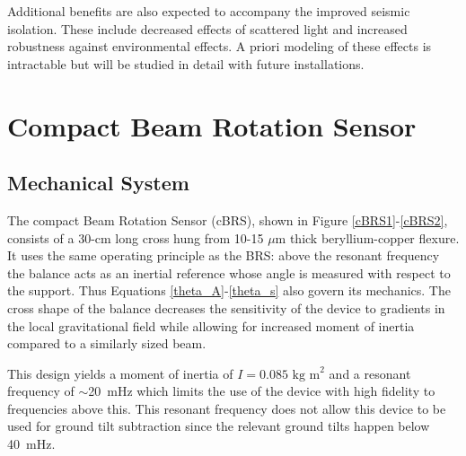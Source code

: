 \documentclass [12pt, proquest]{uwthesis}[2019]
\begin{document}
Additional benefits are also expected to accompany the improved seismic isolation. These include decreased effects of scattered light and increased robustness against environmental effects. A priori modeling of these effects is intractable but will be studied in detail with future installations.


\section{Compact Beam Rotation Sensor} \label{cBRSSec}
\subsection{Mechanical System}

The compact Beam Rotation Sensor (cBRS), shown in Figure \ref{cBRS1}-\ref{cBRS2}, consists of a 30-cm long cross hung from 10-15 $\mu$m thick beryllium-copper flexure. It uses the same operating principle as the BRS: above the resonant frequency the balance acts as an inertial reference whose angle is measured with respect to the support. Thus Equations \ref{theta_A}-\ref{theta_s} also govern its mechanics. The cross shape of the balance decreases the sensitivity of the device to gradients in the local gravitational field while allowing for increased moment of inertia compared to a similarly sized beam. 

This design yields a moment of inertia of $I=0.085\text{ kg m}^2$ and a resonant frequency of $\sim$20~mHz which limits the use of the device with high fidelity to frequencies above this. This resonant frequency does not allow this device to be used for ground tilt subtraction since the relevant ground tilts happen below 40~mHz. 
\end{document}
